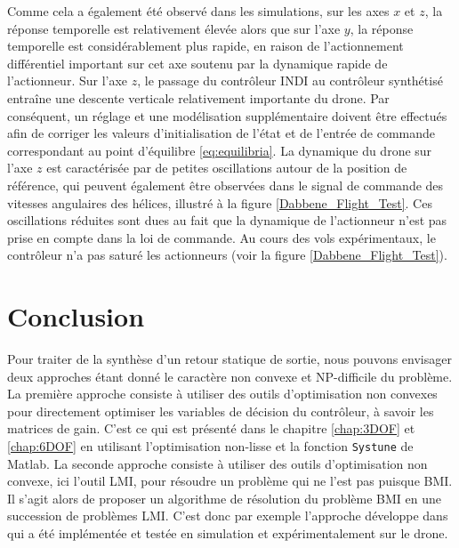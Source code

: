 Comme cela a également été observé dans les simulations, sur les axes $x$ et $z$, la réponse temporelle est relativement élevée alors que sur l'axe $y$, la réponse temporelle est considérablement plus rapide, en raison de l'actionnement différentiel important sur cet axe soutenu par la dynamique rapide de l'actionneur. Sur l'axe $z$, le passage du contrôleur INDI au contrôleur synthétisé entraîne une descente verticale relativement importante du drone. Par conséquent, un réglage et une modélisation supplémentaire doivent être effectués afin de corriger les valeurs d'initialisation de l'état et de l'entrée de commande correspondant au point d'équilibre \eqref{eq:equilibria}. La dynamique du drone sur l'axe $z$ est caractérisée par de petites oscillations autour de la position de référence, qui peuvent également être observées dans le signal de commande des vitesses angulaires des hélices, illustré à la figure \ref{Dabbene_Flight_Test}. Ces oscillations réduites sont dues au fait que la dynamique de l'actionneur n'est pas prise en compte dans la loi de commande.
Au cours des vols expérimentaux, le contrôleur n'a pas saturé les actionneurs (voir la figure \ref{Dabbene_Flight_Test}).



\section{Conclusion}

Pour traiter de la synthèse d'un retour statique de sortie, nous pouvons envisager deux approches étant donné le caractère non convexe et NP-difficile du problème. La première approche consiste à utiliser des outils d'optimisation non convexes pour directement optimiser les variables de décision du contrôleur, à savoir les matrices de gain. C'est ce qui est présenté dans le chapitre \ref{chap:3DOF} et \ref{chap:6DOF} en utilisant l'optimisation  non-lisse et la fonction {\tt Systune} de Matlab. La seconde approche consiste à utiliser des outils d'optimisation non convexe, ici l'outil LMI, pour résoudre un problème qui ne l'est pas puisque BMI. Il s'agit alors de proposer un algorithme de résolution du problème BMI en une succession de problèmes LMI. C'est donc par exemple l'approche développe dans \cite{Arzelier2018} qui a été implémentée et testée en simulation et expérimentalement sur le drone. 

